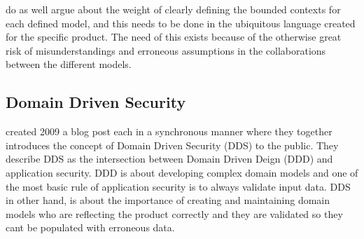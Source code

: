 \textcite{evans_2015} do as well argue about the weight of clearly defining the bounded contexts for each defined model, and this needs to be done in the ubiquitous language created for the specific product. The need of this exists because of the otherwise great risk of misunderstandings and erroneous assumptions in the collaborations between the different models. \parencite{millett_2015}


\subsection{Domain Driven Security}
\textcite{Wilander2009, Johnsson2009} created 2009 a blog post each in a synchronous manner where they together introduces the concept of Domain Driven Security (DDS) to the public. They describe DDS as the intersection between Domain Driven Deign (DDD) and application security. DDD is about developing complex domain models and one of the most basic rule of application security is to always validate input data. DDS in other hand, is about the importance of creating and maintaining domain models who are reflecting the product correctly and they are validated so they cant be populated with erroneous data. \parencite{Wilander2009, Johnsson2009, Arnor2016, Stendahl2016}